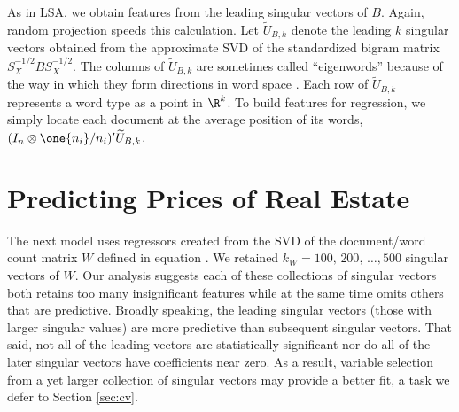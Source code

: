 \documentclass[12pt]{article}
\begin{document}
 
 As in LSA, we obtain features from the leading singular vectors of $B$.  Again, random projection speeds this calculation.  Let $\widetilde{U}_{B,k}$ denote the leading $k$ singular vectors obtained from the approximate SVD of the standardized bigram matrix $S_X^{-1/2} B S_X^{-1/2}$.  The columns of $\widetilde{U}_{B,k}$ are sometimes called ``eigenwords'' because of the way in which they form directions in word space .  Each row of $\widetilde{U}_{B,k}$ represents a word type as a point in $\R^k$.   To build features for regression, we simply locate each document at the average position of its words, $(I_n \otimes \one{n_i}/n_i)'\widetilde{U}_{B,k}$. 


\section{Predicting Prices of Real Estate}


 The next model uses regressors created from the SVD of the document/word
 count matrix $W$ defined in equation .  We retained $k_W = 100,\, 200, \, \ldots, 500$ singular vectors of $W$.   Our analysis suggests each of these collections of singular vectors both retains too many insignificant features while at the same time omits others that are predictive.  Broadly speaking, the leading singular vectors (those with larger singular values) are more predictive than subsequent singular vectors.  That said, not all of the leading vectors are statistically significant nor do all of the later singular vectors have coefficients near zero.   As a result, variable selection from a yet larger collection of singular vectors may provide a better fit, a task we defer to Section \ref{sec:cv}.  
 
 \citet[do CCA before regression][]{fosterkakade07}
\end{document}
